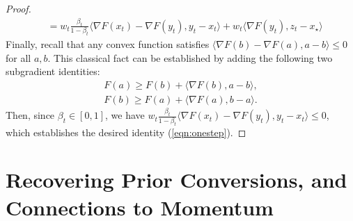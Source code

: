 \documentclass{article}
\begin{document}
\begin{proof}
\begin{align*}
    &= w_t \frac{\beta_t}{1-\beta_t} \langle \nabla F(x_t)-\nabla F(y_t), y_t - x_t\rangle  + w_t  \langle \nabla F(y_t), z_t -x_\star\rangle
\end{align*}
Finally, recall that any convex function satisfies $\langle \nabla F(b)-\nabla F(a),a-b\rangle \le 0$ for all $a,b$. This classical fact can be established by adding the following two subgradient identities:
\begin{align*}
    F(a) \ge F(b) + \langle \nabla F(b), a-b\rangle,\\
    F(b) \ge F(a) + \langle \nabla F(a), b-a \rangle.
\end{align*}
Then, since $\beta_t\in [0,1]$, we have $w_t \frac{\beta_t}{1-\beta_t} \langle \nabla F(x_t)-\nabla F(y_t), y_t - x_t\rangle\le  0$,  which establishes the desired identity (\ref{eqn:onestep}).
\end{proof}
 \section{Recovering Prior Conversions, and Connections to Momentum}\label{app:recover}
\end{document}
